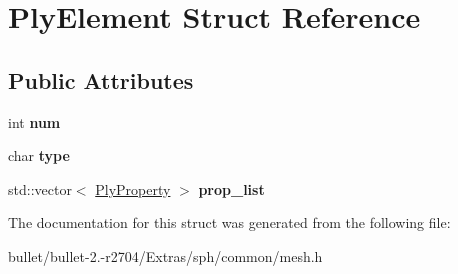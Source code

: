 \hypertarget{struct_ply_element}{\section{Ply\+Element Struct Reference}
\label{struct_ply_element}
}
\subsection*{Public Attributes}
\begin{DoxyCompactItemize}
\item 
\hypertarget{struct_ply_element_a3975c8d9bdd3b4435bca2cb6f7e99733}{int {\bfseries num}}\label{struct_ply_element_a3975c8d9bdd3b4435bca2cb6f7e99733}

\item 
\hypertarget{struct_ply_element_aa445d0ce68f1aab2b969aa1733791bf2}{char {\bfseries type}}\label{struct_ply_element_aa445d0ce68f1aab2b969aa1733791bf2}

\item 
\hypertarget{struct_ply_element_aac28b463a348c13a93bc4de72cca0135}{std\+::vector$<$ \hyperlink{struct_ply_property}{Ply\+Property} $>$ {\bfseries prop\+\_\+list}}\label{struct_ply_element_aac28b463a348c13a93bc4de72cca0135}

\end{DoxyCompactItemize}


The documentation for this struct was generated from the following file\+:\begin{DoxyCompactItemize}
\item 
bullet/bullet-\/2.-\/r2704/\+Extras/sph/common/mesh.\+h\end{DoxyCompactItemize}
